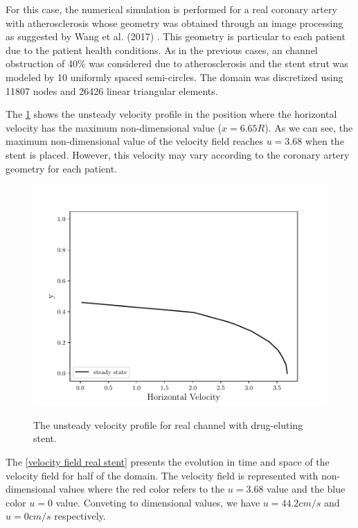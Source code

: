 For this case, the numerical simulation is performed for a real 
coronary artery with atherosclerosis whose geometry was obtained 
through an image processing as suggested by Wang et al. (2017) 
\cite{wang2017}. This geometry is particular to each patient 
due to the patient health conditions. As in the previous cases, 
an channel obstruction of 40\% was considered due to atherosclerosis 
and the stent strut was modeled by
10 uniformly spaced semi-circles.
The domain was discretized using 11807 nodes and 26426 linear 
triangular elements. 

\medskip
The \ref{velocity evolution real stent} shows the unsteady velocity 
profile in the position where the horizontal velocity 
has the maximum non-dimensional value ($x=6.65R$). 
As we can see, the maximum non-dimensional value of the velocity field 
reaches $u=3.68$ when the stent is placed. 
However, this velocity may vary according to the 
coronary artery geometry for each patient.

\begin{figure}[H]
     \centering
     \includegraphics[scale=1]{./02_chaps/cap_solution/figure/vel_RealStrut_evol.pdf}\\
     \caption{
The unsteady velocity profile for real channel with drug-eluting stent.}
     \label{velocity evolution real stent}
\end{figure}

\newpage
The \ref{velocity field real stent} presents the evolution in 
time and space of the velocity field for half of the domain. 
The velocity field is represented with non-dimensional values 
where the red color refers to the $u=3.68$ value and the blue color 
$u=0$ value. Conveting to dimensional values, 
we have $u=44.2cm/s$ and $u=0cm/s$ respectively.


